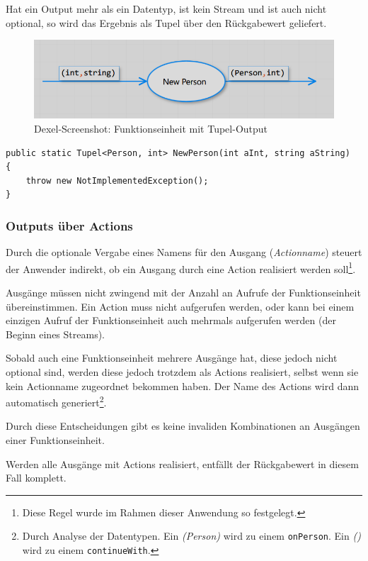 	Hat ein Output mehr als ein Datentyp, ist kein Stream und ist auch nicht optional, so
	wird das Ergebnis als Tupel über den Rückgabewert geliefert.
	
		\begin{figure}[H]
			\centering
			\includegraphics[width=.8\linewidth]{./img/roslyn_twoDatatypesOneOutput.png} 
			\caption{Dexel-Screenshot: Funktionseinheit mit Tupel-Output}
		\end{figure}

	
	
	\begin{lstlisting}[caption=Mit Dexel generierter Code ]
public static Tupel<Person, int> NewPerson(int aInt, string aString)
{
	throw new NotImplementedException();
}
	\end{lstlisting}

	
\subsubsection{Outputs über Actions}

	 Durch die optionale Vergabe eines Namens für den Ausgang (\textit{Actionname})  steuert der Anwender indirekt, ob ein Ausgang durch eine Action realisiert werden soll\footnote{Diese Regel wurde im Rahmen dieser Anwendung so festgelegt.}. 
	
	Ausgänge müssen nicht zwingend mit
	der Anzahl an Aufrufe der Funktionseinheit übereinstimmen. Ein Action muss
	nicht aufgerufen werden, oder kann bei einem einzigen Aufruf der Funktionseinheit auch
	mehrmals aufgerufen werden (der Beginn eines Streams). 
	
	Sobald auch eine Funktionseinheit mehrere Ausgänge hat, diese jedoch nicht
	optional sind, werden diese jedoch trotzdem als Actions realisiert, selbst wenn sie kein
	Actionname zugeordnet bekommen haben. Der Name des Actions wird dann
	automatisch generiert\footnote{	Durch Analyse der Datentypen. Ein \textit{(Person)} wird zu einem \texttt{onPerson}. Ein \textit{()} wird zu einem \texttt{continueWith}.}.
	
	Durch diese Entscheidungen gibt es keine invaliden Kombinationen an
	Ausgängen einer Funktionseinheit.
	
	
	Werden alle Ausgänge mit Actions realisiert, entfällt der Rückgabewert in diesem Fall komplett.
	
